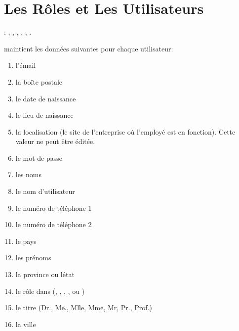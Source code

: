 \chapter{Les R\^oles et Les Utilisateurs}\label{chap:utilisateurs}

\utilisateurs: \lienadmin, \liencaissier, \liengestionnairedesstocks,
		       \lienmagasinier, \lienmanager, \lienvendeur.\\


\label{sec:utilisateurs-introduction}

\yeren maintient les donn\'ees suivantes pour chaque utilisateur:
\begin{enumerate}[1)]
	\item l'\'email 
	\item la bo\^ite postale
	\item le date de naissance 
	\item le lieu de naissance 
	\item la localisation (le site de l'entreprise o\`u l'employ\'e
	      est en fonction). Cette valeur ne peut \^etre \'edit\'ee.
	\item le mot de passe \obligatoire
	\item les noms \obligatoire
	\item le nom d'utilisateur \obligatoire
	\item le num\'ero de t\'el\'ephone 1 
	\item le num\'ero de t\'el\'ephone 2 
	\item le pays 
	\item les pr\'enoms \obligatoire
	\item la province ou l\'etat
	\item le r\^ole dans \yeren (\admin, \caissier, \magasinier, \manager, ou \vendeur) \obligatoire
	\item le titre (Dr., Me., Mlle, Mme, Mr, Pr., Prof.) \obligatoire
	\item la ville 
\end{enumerate}

\newpage



\newpage



\newpage



\newpage



\newpage


	
\newpage


